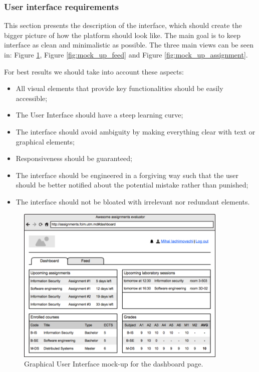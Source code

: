 \documentclass[12pt,oneside,a4paper]{article}
\begin{document}
\subsubsection{User interface requirements}
This section presents the description of the interface, which should create the bigger picture of how the platform should look like. The main goal is to keep interface as clean and minimalistic as possible. The three main views can be seen in: Figure \ref{fig:mock_up_dashboard}, Figure \ref{fig:mock_up_feed} and Figure \ref{fig:mock_up_assignment}.

For best results we should take into account these aspects:
\begin{itemize}
  \item All visual elements that provide key functionalities should be easily accessible;
  \item The User Interface should have a steep learning curve;
  \item The interface should avoid ambiguity by making everything clear with text or graphical elements;
  \item Responsiveness should be guaranteed;
  \item The interface should be engineered in a forgiving way such that the user should be better notified about the potential mistake rather than punished;
  \item The interface should not be bloated with irrelevant nor redundant elements.
\end{itemize}

\begin{figure}[!ht]
  \centering
    \includegraphics[width=0.9\textwidth]{pic/wireframe-dashboard.png}
    \caption{Graphical User Interface mock-up for the dashboard page.}
    \label{fig:mock_up_dashboard}
\end{figure}
\end{document}
